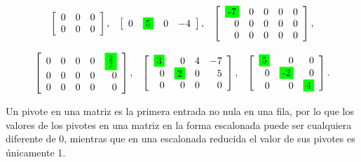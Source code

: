 \documentclass{article}
\begin{document}
\begin{equation*}
    \begin{array}{lrl}
        {\left[\begin{array}{rrr}
            0 & 0 & 0 \\
            0 & 0 & 0
            \end{array}\right],} 
            & {\left[\begin{array}{llll}
            0 & \colorbox{green}{5} & 0 & -4
            \end{array}\right],} 
            & {\left[\begin{array}{rrrrr}
            \colorbox{green}{-7} & 0 & 0 & 0 & 0 \\
            0 & 0 & 0 & 0 & 0 \\
            0 & 0 & 0 & 0 & 0
            \end{array}\right],} 
    \end{array}
\end{equation*}

\begin{equation*}
    \begin{array}{lrl}
        {\left[\begin{array}{rrrrr}
            0 & 0 & 0 & 0 & \colorbox{green}{$\frac{2}{3}$} \\
            0 & 0 & 0 & 0 & 0 \\
            0 & 0 & 0 & 0 & 0
            \end{array}\right],} 
            & {\left[\begin{array}{rrrr}
            \colorbox{green}{3} & 0 & 4 & -7 \\
            0 & \colorbox{green}{2} & 0 & 5 \\
            0 & 0 & 0 & 0
            \end{array}\right],} 
            & {\left[\begin{array}{rrr}
            \colorbox{green}{5} & 0 & 0 \\
            0 & \colorbox{green}{-2} & 0 \\
            0 & 0 & \colorbox{green}{4}
            \end{array}\right] .}
    \end{array}
\end{equation*}

\begin{tcolorbox}[colback=green!20!white,colframe=green!80!black,title=Pivote]
    Un pivote en una matriz es la primera entrada no nula en una fila, por lo que los valores de los pivotes en una matriz en la forma escalonada puede ser cualquiera diferente de 0, mientras que en una escalonada reducida el valor de sus pivotes es únicamente 1.
\end{tcolorbox}
\end{document}

